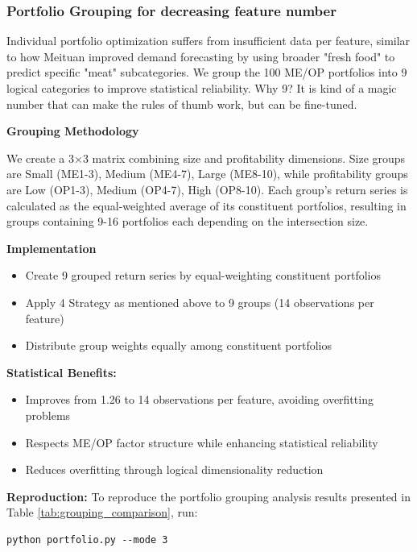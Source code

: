 \documentclass[12pt]{article}
\begin{document}
\subsubsection{Portfolio Grouping for decreasing feature number}

Individual portfolio optimization suffers from insufficient data per feature, similar to how Meituan improved demand forecasting by using broader "fresh food" to predict specific "meat" subcategories. We group the 100 ME/OP portfolios into 9 logical categories to improve statistical reliability. Why 9? It is kind of a magic number that can make the rules of thumb work, but can be fine-tuned.

\textbf{Grouping Methodology}

We create a 3×3 matrix combining size and profitability dimensions. Size groups are Small (ME1-3), Medium (ME4-7), Large (ME8-10), while profitability groups are Low (OP1-3), Medium (OP4-7), High (OP8-10). Each group's return series is calculated as the equal-weighted average of its constituent portfolios, resulting in groups containing 9-16 portfolios each depending on the intersection size.

\textbf{Implementation}
\begin{itemize}
    \item Create 9 grouped return series by equal-weighting constituent portfolios
    \item Apply 4 Strategy as mentioned above to 9 groups (14 observations per feature)
    \item Distribute group weights equally among constituent portfolios
\end{itemize}

\textbf{Statistical Benefits:}
\begin{itemize}
    \item Improves from 1.26 to 14 observations per feature, avoiding overfitting problems
    \item Respects ME/OP factor structure while enhancing statistical reliability
    \item Reduces overfitting through logical dimensionality reduction
\end{itemize}

\textbf{Reproduction:}
To reproduce the portfolio grouping analysis results presented in Table \ref{tab:grouping_comparison}, run:
\begin{lstlisting}
python portfolio.py --mode 3
\end{lstlisting}
\end{document}
